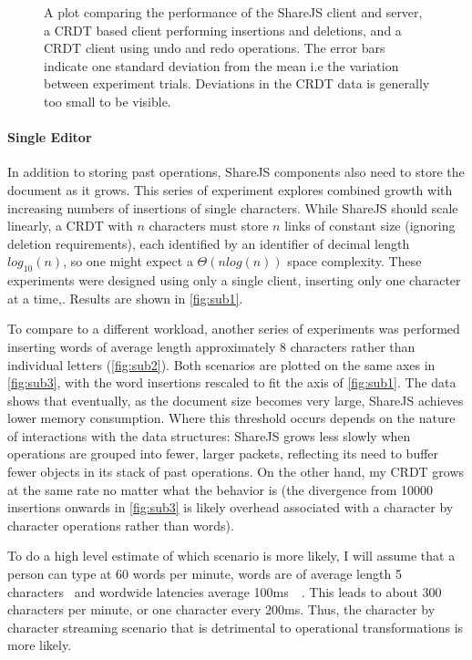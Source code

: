 \documentclass[12pt,a4paper,twoside,openright]{report}
\begin{document}
				\begin{figure}[htb]
					\centering
					
					\caption[Memory Consumption Sanity Check] {A plot comparing the performance of the ShareJS client and server, a CRDT based client performing insertions and deletions, and a CRDT client using undo and redo operations. The error bars indicate one standard deviation from the mean i.e the variation between experiment trials. Deviations in the CRDT data is generally too small to be visible.}
					\label{fig:sanitycheck}
				\end{figure}
		
			\paragraph{Single Editor} \label{sec:singleeditor}
				In addition to storing past operations, ShareJS components also need to store the document as it grows. This series of experiment explores combined growth with increasing numbers of insertions of single characters. While ShareJS should scale linearly, a CRDT with $n$ characters must store $n$ links of constant size (ignoring deletion requirements), each identified by an identifier of decimal length $log_{10}(n)$, so one might expect a $\Theta (nlog(n))$ space complexity. These experiments were designed using only a single client, inserting only one character at a time,. Results are shown in \ref{fig:sub1}.
					
				To compare to a different workload, another series of experiments was performed inserting words of average length approximately 8 characters rather than individual letters (\ref{fig:sub2}). Both scenarios are plotted on the same axes in \ref{fig:sub3}, with the word insertions rescaled to fit the axis of \ref{fig:sub1}. The data shows that eventually, as the document size becomes very large, ShareJS achieves lower memory consumption. Where this threshold occurs depends on the nature of interactions with the data structures: ShareJS grows less slowly when operations are grouped into fewer, larger packets, reflecting its need to buffer fewer objects in its stack of past operations. On the other hand, my CRDT grows at the same rate no matter what the behavior is (the divergence from 10000 insertions onwards in \ref{fig:sub3} is likely overhead associated with a character by character operations rather than words). 
				
				To do a high level estimate of which scenario is more likely, I will assume that a person can type at 60 words per minute, words are of average length 5 characters~\cite{bochkarev2012average} and wordwide latencies average 100ms~\cite{latencies}~\cite{fccbroadband}. This leads to about 300 characters per minute, or one character every 200ms. Thus, the character by character streaming scenario that is detrimental to operational transformations is more likely.
				
\end{document}
